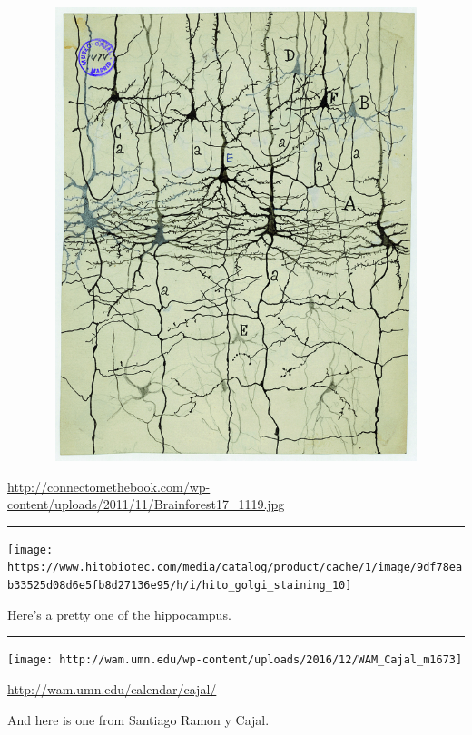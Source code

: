 \documentclass[]{article}
\begin{document}
\begin{center}\includegraphics[width=8.5in,height=500px]{img/golgi-stain} \end{center}

\url{http://connectomethebook.com/wp-content/uploads/2011/11/Brainforest17_1119.jpg}

\begin{center}\rule{0.5\linewidth}{\linethickness}\end{center}

\begin{center}\texttt{[image: https://www.hitobiotec.com/media/catalog/product/cache/1/image/9df78eab33525d08d6e5fb8d27136e95/h/i/hito\_golgi\_staining\_10]} \end{center}

Here's a pretty one of the hippocampus.

\begin{center}\rule{0.5\linewidth}{\linethickness}\end{center}

\begin{center}\texttt{[image: http://wam.umn.edu/wp-content/uploads/2016/12/WAM\_Cajal\_m1673]} \end{center}

\url{http://wam.umn.edu/calendar/cajal/}

And here is one from Santiago Ramon y Cajal.
\end{document}
